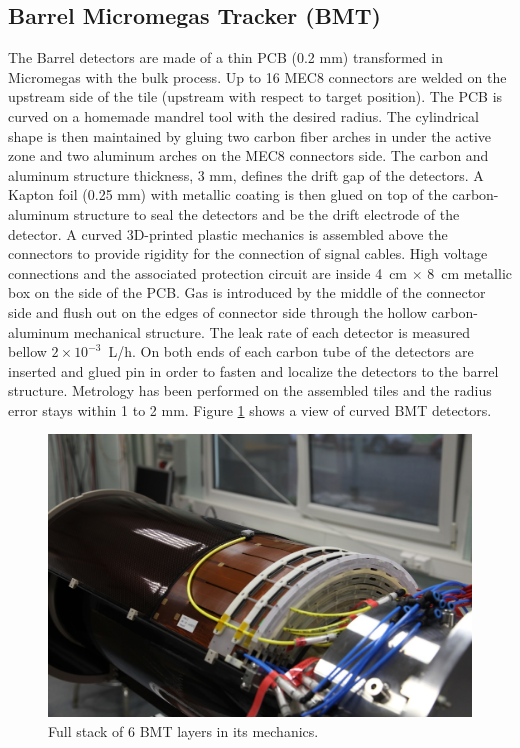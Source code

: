 \subsection{Barrel Micromegas Tracker (BMT)}

The Barrel detectors are made of a thin PCB (0.2 mm) transformed in Micromegas with the bulk process. Up to 16 MEC8 connectors 
are welded on the upstream side of the tile (upstream with respect to target position). The PCB is curved on a homemade mandrel tool with the desired radius. The cylindrical shape is then maintained by gluing two carbon fiber arches in under the active zone and two aluminum arches on the MEC8 connectors side. The carbon and aluminum structure thickness, 3 mm, defines the drift gap of the detectors. A Kapton foil (0.25 mm) with metallic coating is then glued on top of the carbon-aluminum structure to seal the detectors and be the drift electrode of the detector. A curved 3D-printed plastic mechanics is assembled above 
the connectors to provide rigidity for the connection of signal cables.  High voltage connections and the associated protection circuit are inside 4~cm $\times$ 8~cm metallic box on the side of the PCB.  Gas is introduced by the middle of the connector side and flush out on the edges of connector side through the hollow carbon-aluminum mechanical structure. The leak rate of each detector is measured bellow \(2\times10^{-3}\)~L/h.  On both ends of each carbon tube of the detectors are inserted and glued pin in order to fasten and localize the detectors to the barrel structure. Metrology has been performed on the assembled tiles and the radius error stays within 1 to 2 mm. Figure \ref{fig:mm-fig4} shows a view of curved BMT detectors.

\begin{figure}[htb]
 \includegraphics[width=1.0\columnwidth,keepaspectratio]{images/fig5}
 \caption{Full stack of 6 BMT layers in its mechanics.}
 \label{fig:mm-fig4}
\end{figure}

